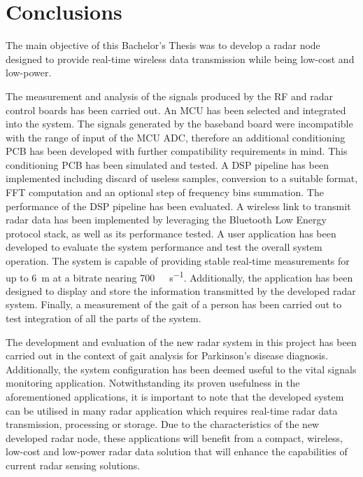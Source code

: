 \chapter{Conclusions}

The main objective of this Bachelor's Thesis was to develop a radar node designed to provide real-time wireless data transmission while being low-cost and low-power.

The measurement and analysis of the signals produced by the RF and radar control boards has been carried out. An MCU has been selected and integrated into the system. The signals generated by the baseband board were incompatible with the range of input of the MCU ADC, therefore an additional conditioning PCB has been developed with further compatibility requirements in mind. This conditioning PCB has been simulated and tested. A DSP pipeline has been implemented including discard of useless samples, conversion to a suitable format, FFT computation and an optional step of frequency bins summation. The performance of the DSP pipeline has been evaluated. A wireless link to transmit radar data has been implemented by leveraging the Bluetooth Low Energy protocol stack, as well as its performance tested. A user application has been developed to evaluate the system performance and test the overall system operation. The system is capable of providing stable real-time measurements for up to \SI{6}{\metre} at a bitrate nearing \SI{700}{\kilo\bit\per\second}. Additionally, the application has been designed to display and store the information transmitted by the developed radar system. Finally, a measurement of the gait of a person has been carried out to test integration of all the parts of the system.

The development and evaluation of the new radar system in this project has been carried out in the context of gait analysis for Parkinson's disease diagnosis. Additionally, the system configuration has been deemed useful to the vital signals monitoring application. Notwithstanding its proven usefulness in the aforementioned applications, it is important to note that the developed system can be utilised in many radar application which requires real-time radar data transmission, processing or storage. Due to the characteristics of the new developed radar node, these applications will benefit from a compact, wireless, low-cost and low-power radar data solution that will enhance the capabilities of current radar sensing solutions.